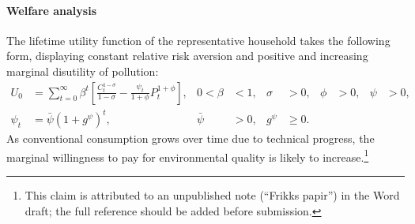 \paragraph{Welfare analysis}

The lifetime utility function of the representative household takes the following form, displaying constant relative risk aversion and positive and increasing marginal disutility of pollution:
\begin{align}
U_0 &= \sum_{t=0}^{\infty} \beta^t \left[\frac{C_t^{1-\sigma}}{1-\sigma} - \frac{\psi_t}{1+\phi}P_t^{1+\phi}\right],
&
0<\beta&<1,
&
\sigma &> 0,
&
\phi &> 0,
&
\psi &> 0,
\label{eq:quant:lifetime-utility}
\\
\psi_t &= \bar\psi\left(1+g^\psi\right)^t,
&
\bar\psi &> 0,
&
g^\psi &\ge 0.
\label{eq:quant:psi-progress}
\end{align}
As conventional consumption grows over time due to technical progress, the marginal willingness to pay for environmental quality is likely to increase.\footnote{This claim is attributed to an unpublished note (``Frikks papir'') in the Word draft; the full reference should be added before submission.}

